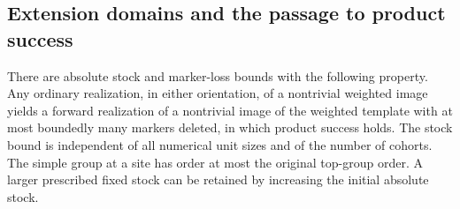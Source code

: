 \subsection{Extension domains and the passage to product success}

\begin{theorem}\label{t:weighted-product-success}
There are absolute stock and marker-loss bounds with the following
property.  Any ordinary realization, in either orientation, of a nontrivial
weighted image yields a forward realization of a nontrivial image of the
weighted template with at most boundedly many markers deleted, in which
product success holds.  The stock bound is independent of all numerical
unit sizes and of the number of cohorts.  The simple group at a site has
order at most the original top-group order.  A larger prescribed fixed
stock can be retained by increasing the initial absolute stock.
\end{theorem}
